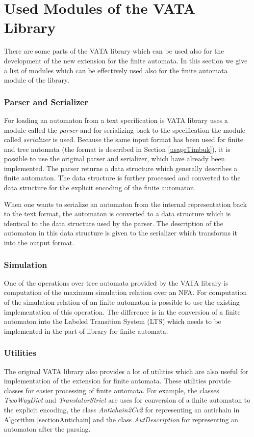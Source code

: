 \section{Used Modules of the VATA Library}
There are some parts of the VATA library which can be used also for the development of the new extension for the finite automata. 
In this section we give a list of modules which can be effectively used also for the finite automata module of the library.

\subsubsection{Parser and Serializer}
For loading an automaton from a text specification is VATA library uses a module called the \emph{parser} and for serializing back to the specification the 
module called \emph{serializer} is used. 
Because the same input format has been used for finite and tree automata (the format is described in Section \ref{usageTimbuk}),
it is possible to use the original parser and serializer, which have already been implemented. 
The parser returns a data structure which generally describes a finite automaton. The data structure is further processed and converted 
to the data structure for the explicit encoding of the finite automaton. 

When one wants to serialize an automaton from the internal representation back to the text format, 
the automaton is converted to a data structure which is identical to the data structure used by the parser. The description of the automaton in this
data structure is given to the serializer which transforms it into the output format.

\subsubsection{Simulation}
One of the operations over tree automata provided by the VATA library is computation of the maximum simulation relation over an NFA. 
For computation of the simulation relation of an finite automaton is possible to use the existing implementation of this operation. 
The difference is in the conversion of a finite automaton into the Labeled Transition System (LTS) which
needs to be implemented in the part of library for finite automata.

\subsubsection{Utilities}
The original VATA library also provides a lot of utilities which are also useful for implementation of the extension for finite automata. These utilities
provide classes for easier processing of finite automata. For example, the classes \emph{TwoWayDict} and \emph{TranslatorStrict} are uses for conversion
of a finite automaton to the explicit encoding, the class \emph{Antichain2Cv2} for representing an antichain in Algorithm \ref{sectionAntichain} 
and the class \emph{AutDescription} for representing an automaton after the parsing.

